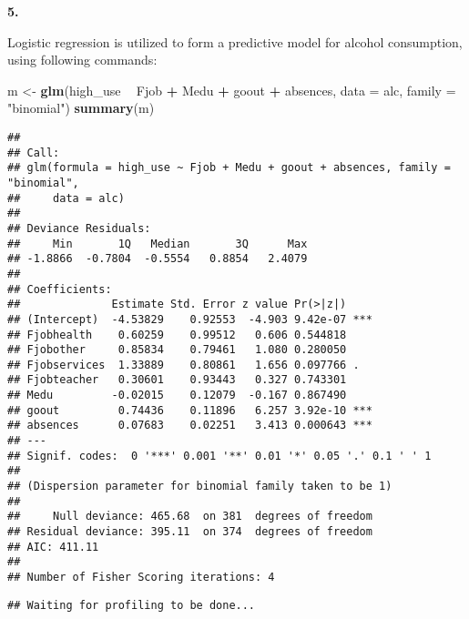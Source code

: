 \documentclass[]{article}
\newenvironment{Shaded}{\begin{snugshade}}{\end{snugshade}}
\newcommand{\DataTypeTok}[1]{\textcolor[rgb]{0.13,0.29,0.53}{#1}}
\newcommand{\KeywordTok}[1]{\textcolor[rgb]{0.13,0.29,0.53}{\textbf{#1}}}
\newcommand{\NormalTok}[1]{#1}
\newcommand{\OperatorTok}[1]{\textcolor[rgb]{0.81,0.36,0.00}{\textbf{#1}}}
\newcommand{\StringTok}[1]{\textcolor[rgb]{0.31,0.60,0.02}{#1}}
\begin{document}
\textbf{5.}

Logistic regression is utilized to form a predictive model for alcohol
consumption, using following commands:

\begin{Shaded}
\begin{Highlighting}[]
\NormalTok{m <-}\StringTok{ }\KeywordTok{glm}\NormalTok{(high_use }\OperatorTok{~}\StringTok{ }\NormalTok{Fjob }\OperatorTok{+}\StringTok{ }\NormalTok{Medu }\OperatorTok{+}\StringTok{ }\NormalTok{goout }\OperatorTok{+}\StringTok{ }\NormalTok{absences, }\DataTypeTok{data =}\NormalTok{ alc, }\DataTypeTok{family =} \StringTok{"binomial"}\NormalTok{)}
\KeywordTok{summary}\NormalTok{(m)}
\end{Highlighting}
\end{Shaded}

\begin{verbatim}
## 
## Call:
## glm(formula = high_use ~ Fjob + Medu + goout + absences, family = "binomial", 
##     data = alc)
## 
## Deviance Residuals: 
##     Min       1Q   Median       3Q      Max  
## -1.8866  -0.7804  -0.5554   0.8854   2.4079  
## 
## Coefficients:
##              Estimate Std. Error z value Pr(>|z|)    
## (Intercept)  -4.53829    0.92553  -4.903 9.42e-07 ***
## Fjobhealth    0.60259    0.99512   0.606 0.544818    
## Fjobother     0.85834    0.79461   1.080 0.280050    
## Fjobservices  1.33889    0.80861   1.656 0.097766 .  
## Fjobteacher   0.30601    0.93443   0.327 0.743301    
## Medu         -0.02015    0.12079  -0.167 0.867490    
## goout         0.74436    0.11896   6.257 3.92e-10 ***
## absences      0.07683    0.02251   3.413 0.000643 ***
## ---
## Signif. codes:  0 '***' 0.001 '**' 0.01 '*' 0.05 '.' 0.1 ' ' 1
## 
## (Dispersion parameter for binomial family taken to be 1)
## 
##     Null deviance: 465.68  on 381  degrees of freedom
## Residual deviance: 395.11  on 374  degrees of freedom
## AIC: 411.11
## 
## Number of Fisher Scoring iterations: 4
\end{verbatim}

\begin{Shaded}
\end{Shaded}

\begin{verbatim}
## Waiting for profiling to be done...
\end{verbatim}
\end{document}
